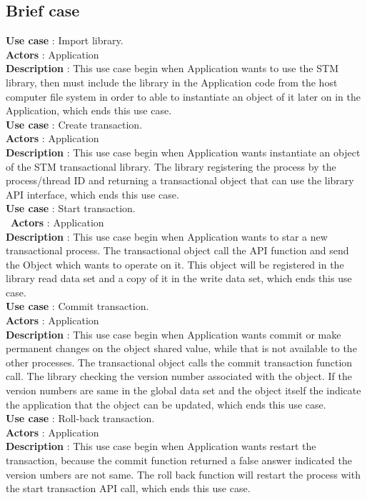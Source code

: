 \documentclass[12pt]{article}
\begin{document}
{\setlength{\parindent}{0cm}
\subsection{Brief case}
\textbf{Use case} : Import library.\\
\textbf{Actors} : Application\\
\textbf{Description} : This use case begin when Application wants to use the STM library, then must include the library in the Application code from the host computer file system in order to able to instantiate an object of it later on in the Application, which ends this use case.\\

\textbf{Use case} : Create transaction.\\
\textbf{Actors} : Application\\
\textbf{Description} : This use case begin when Application wants instantiate an object of the STM transactional library. The library registering the process by the process/thread ID and returning a transactional object that can use the library API interface, which ends this use case.\\

\textbf{Use case} : Start transaction.\\\
\textbf{Actors} : Application\\
\textbf{Description} : This use case begin when Application wants to star  a new transactional process. The transactional object call the API function and send the Object which wants to operate on it. This object will be registered in the library read data set and a copy of it in the write data set, which ends this use case.\\  

\textbf{Use case} : Commit transaction.\\
\textbf{Actors} : Application\\
\textbf{Description} : This use case begin when Application wants commit or make permanent changes on the object shared value, while that is not available to the other processes. The transactional object calls the commit transaction function call. The library checking the version number associated with the object. If the version numbers are same in the global data set and the object itself the indicate the application that the object can be updated,  which ends this use case.\\ 

\textbf{Use case} : Roll-back transaction.\\
\textbf{Actors} : Application\\
\textbf{Description} : This use case begin when Application wants restart the transaction, because the commit function returned a false answer indicated the version umbers are not same. The roll back function will restart the process with the start transaction API call, which ends this use case. \\

}
\end{document}
